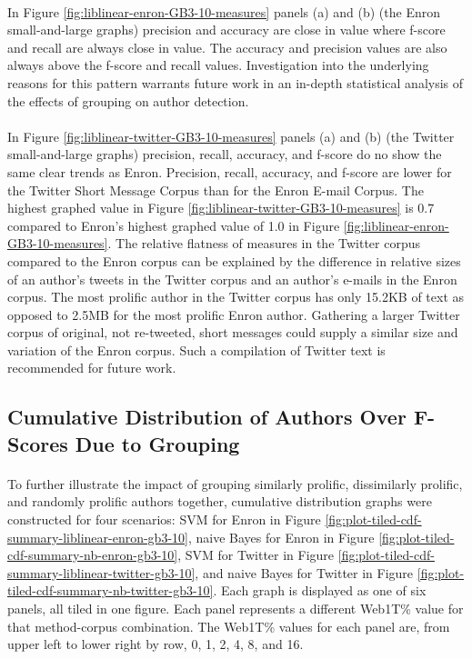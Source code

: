 	\paragraph*{} In Figure \ref{fig:liblinear-enron-GB3-10-measures} panels (a) and (b) (the Enron small-and-large graphs) precision and accuracy are close in value where f-score and recall are always close in value.  The accuracy and precision values are also always above the f-score and recall values.  Investigation into the underlying reasons for this pattern warrants future work in an in-depth statistical analysis of the effects of grouping on author detection.
	\paragraph*{} In Figure \ref{fig:liblinear-twitter-GB3-10-measures} panels (a) and (b) (the Twitter small-and-large graphs) precision, recall, accuracy, and f-score do no show the same clear trends as Enron. Precision, recall, accuracy, and f-score are lower for the Twitter Short Message Corpus than for the Enron E-mail Corpus. The highest graphed value in Figure \ref{fig:liblinear-twitter-GB3-10-measures} is 0.7 compared to Enron's highest graphed value of 1.0 in Figure \ref{fig:liblinear-enron-GB3-10-measures}.  The relative flatness of measures in the Twitter corpus compared to the Enron corpus can be explained by the difference in relative sizes of an author's tweets in the Twitter corpus and an author's e-mails in the Enron corpus.  The most prolific author in the Twitter corpus has only 15.2KB of text as opposed to 2.5MB for the most prolific Enron author.  Gathering a larger Twitter corpus of original, not re-tweeted, short messages could supply a similar size and variation of the Enron corpus. Such a compilation of Twitter text is recommended for future work.
	
	\subsection{Cumulative Distribution of Authors Over F-Scores Due to Grouping}
	\paragraph*{} To further illustrate the impact of grouping similarly prolific, dissimilarly prolific, and randomly prolific authors together, cumulative distribution graphs were constructed for four scenarios: SVM for Enron in Figure \ref{fig:plot-tiled-cdf-summary-liblinear-enron-gb3-10}, naive Bayes for Enron in Figure \ref{fig:plot-tiled-cdf-summary-nb-enron-gb3-10}, SVM for Twitter in Figure \ref{fig:plot-tiled-cdf-summary-liblinear-twitter-gb3-10}, and naive Bayes for Twitter in Figure \ref{fig:plot-tiled-cdf-summary-nb-twitter-gb3-10}.  Each graph is displayed as one of six panels, all tiled in one figure.  Each panel represents a different Web1T\% value for that method-corpus combination.  The Web1T\% values for each panel are, from upper left to lower right by row, 0, 1, 2, 4, 8, and 16.  
